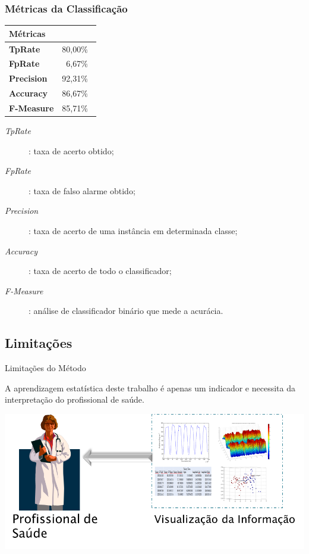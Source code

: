 \documentclass{beamer}
\begin{document}
\begin{frame}
   \frametitle{Métricas da Classificação}
   \begin{block}{}
   		\begin{table}[!htbp]
				\label{table:metricasmatrizconfusao}
				\centering
				\begin{tabular}{|l|r|}
				\hline
				\multicolumn{2}{|l|}{\textbf{Métricas}} \\ \hline
				\textbf{TpRate}                    & 80,00$\%$\               \\ \hline
				\textbf{FpRate}                    & 6,67$\%$\                \\ \hline
				\textbf{Precision}                 & 92,31$\%$\                \\ \hline
				\textbf{Accuracy}                  & 86,67$\%$\                \\ \hline
				\textbf{F-Measure}                 & 85,71$\%$\                \\ \hline
				\end{tabular}
				\end{table}
	\end{block}
     \begin{block}{}
				\begin{description}
				\item [\textit{TpRate}]: taxa de acerto obtido;
				\item [\textit{FpRate}]: taxa de falso alarme obtido;
				\item [\textit{Precision}]: taxa de acerto de uma instância em determinada classe;
				\item [\textit{Accuracy}]: taxa de acerto de todo o classificador;
				\item [\textit{F-Measure}]: análise de classificador binário que mede a acurácia.
				\end{description}
    \end{block}
\end{frame}

\subsection{Limitações}
\begin{frame}{Limitações do Método}
	\begin{block}{}
	A aprendizagem estatística deste trabalho é apenas um indicador e necessita da interpretação do profissional de saúde.
	\end{block}
  \begin{block}{}
      \center \includegraphics[height=1.6 in]{img/visualizacaomedico.png}
  \end{block}
\end{frame}
\end{document}
